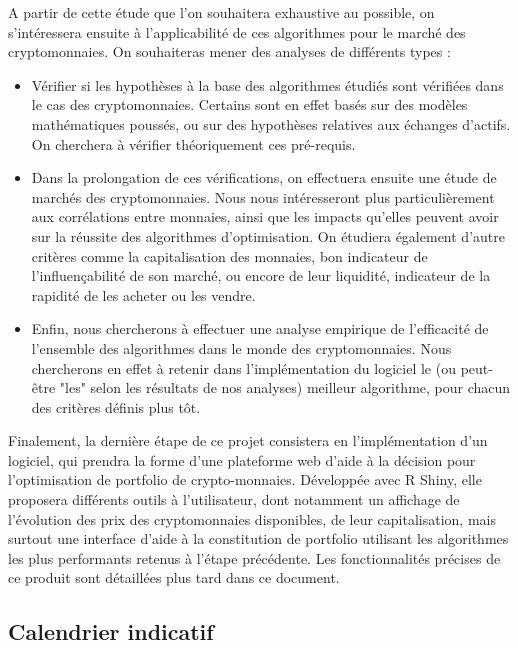 \documentclass[a4paper]{article}
\begin{document}
A partir de cette étude que l'on souhaitera exhaustive au possible, on s'intéressera ensuite à l'applicabilité de ces algorithmes pour le marché des cryptomonnaies. On souhaiteras mener des analyses de différents types :
\begin{itemize}
    \item Vérifier si les hypothèses à la base des algorithmes étudiés sont vérifiées dans le cas des cryptomonnaies. Certains sont en effet basés sur des modèles mathématiques poussés, ou sur des hypothèses relatives aux échanges d'actifs. On cherchera à vérifier théoriquement ces pré-requis.
    \item Dans la prolongation de ces vérifications, on effectuera ensuite une étude de marchés des cryptomonnaies. Nous nous intéresseront plus particulièrement aux corrélations entre monnaies, ainsi que les impacts qu'elles peuvent avoir sur la réussite des algorithmes d'optimisation. On étudiera également d'autre critères comme la capitalisation des monnaies, bon indicateur de l'influençabilité de son marché, ou encore de leur liquidité, indicateur de la rapidité de les acheter ou les vendre.
    \item Enfin, nous chercherons à effectuer une analyse empirique de l'efficacité de l'ensemble des algorithmes dans le monde des cryptomonnaies. Nous chercherons en effet à retenir dans l'implémentation du logiciel le (ou peut-être "les" selon les résultats de nos analyses) meilleur algorithme, pour chacun des critères définis plus tôt.
\end{itemize}\medskip

Finalement, la dernière étape de ce projet consistera en l'implémentation d'un logiciel, qui prendra la forme d’une plateforme web d’aide à la décision pour l’optimisation de portfolio de crypto-monnaies. Développée avec R Shiny, elle proposera différents outils à l'utilisateur, dont notamment un affichage de l'évolution des prix des cryptomonnaies disponibles, de leur capitalisation, mais surtout une interface d'aide à la constitution de portfolio utilisant les algorithmes les plus performants retenus à l'étape précédente. Les fonctionnalités précises de ce produit sont détaillées plus tard dans ce document.

\subsection{Calendrier indicatif}
\end{document}
